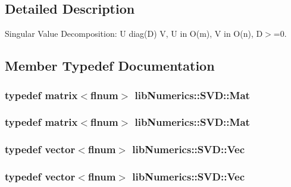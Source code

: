 \subsection{Detailed Description}
Singular Value Decomposition\+: U diag(\+D) V, U in O(m), V in O(n), D$>$=0. 

\subsection{Member Typedef Documentation}
\hypertarget{classlibNumerics_1_1SVD_af7fa146726f27635a88ef053d5dbd4ab}{}
\subsubsection[{Mat}]{\setlength{\rightskip}{0pt plus 5cm}typedef {\bf matrix}$<${\bf flnum}$>$ {\bf lib\+Numerics\+::\+S\+V\+D\+::\+Mat}}\label{classlibNumerics_1_1SVD_af7fa146726f27635a88ef053d5dbd4ab}
\hypertarget{classlibNumerics_1_1SVD_af7fa146726f27635a88ef053d5dbd4ab}{}
\subsubsection[{Mat}]{\setlength{\rightskip}{0pt plus 5cm}typedef {\bf matrix}$<${\bf flnum}$>$ {\bf lib\+Numerics\+::\+S\+V\+D\+::\+Mat}}\label{classlibNumerics_1_1SVD_af7fa146726f27635a88ef053d5dbd4ab}
\hypertarget{classlibNumerics_1_1SVD_ad713d0bff81dcdd50acc63e285fb6c0d}{}
\subsubsection[{Vec}]{\setlength{\rightskip}{0pt plus 5cm}typedef {\bf vector}$<${\bf flnum}$>$ {\bf lib\+Numerics\+::\+S\+V\+D\+::\+Vec}}\label{classlibNumerics_1_1SVD_ad713d0bff81dcdd50acc63e285fb6c0d}
\hypertarget{classlibNumerics_1_1SVD_ad713d0bff81dcdd50acc63e285fb6c0d}{}
\subsubsection[{Vec}]{\setlength{\rightskip}{0pt plus 5cm}typedef {\bf vector}$<${\bf flnum}$>$ {\bf lib\+Numerics\+::\+S\+V\+D\+::\+Vec}}\label{classlibNumerics_1_1SVD_ad713d0bff81dcdd50acc63e285fb6c0d}


